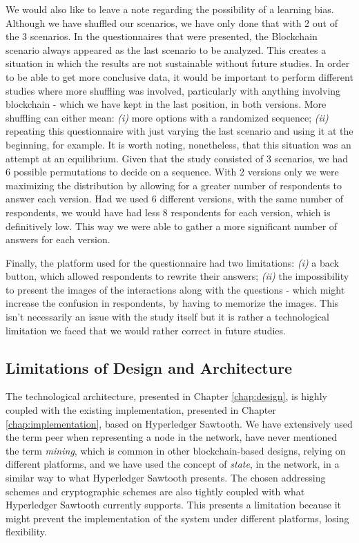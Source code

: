 We would also like to leave a note regarding the possibility of a learning bias. Although we have shuffled our scenarios, we have only done that with 2 out of the 3 scenarios. In the questionnaires that were presented, the Blockchain scenario always appeared as the last scenario to be analyzed. This creates a situation in which the results are not sustainable without future studies. In order to be able to get more conclusive data, it would be important to perform different studies where more shuffling was involved, particularly with anything involving blockchain - which we have kept in the last position, in both versions. More shuffling can either mean: \textit{(i)} more options with a randomized sequence; \textit{(ii)} repeating this questionnaire with just varying the last scenario and using it at the beginning, for example. It is worth noting, nonetheless, that this situation was an attempt at an equilibrium. Given that the study consisted of 3 scenarios, we had 6 possible permutations to decide on a sequence. With 2 versions only we were maximizing the distribution by allowing for a greater number of respondents to answer each version. Had we used 6 different versions, with the same number of respondents, we would have had less 8 respondents for each version, which is definitively low. This way we were able to gather a more significant number of answers for each version.

Finally, the platform used for the questionnaire had two limitations: \textit{(i)} a back button, which allowed respondents to rewrite their answers; \textit{(ii)} the impossibility to present the images of the interactions along with the questions - which might increase the confusion in respondents, by having to memorize the images. This isn't necessarily an issue with the study itself but it is rather a technological limitation we faced that we would rather correct in future studies.

\subsection{Limitations of Design and Architecture}

The technological architecture, presented in Chapter \ref{chap:design}, is highly coupled with the existing implementation, presented in Chapter \ref{chap:implementation}, based on Hyperledger Sawtooth. We have extensively used the term peer when representing a node in the network, have never mentioned the term \emph{mining}, which is common in other blockchain-based designs, relying on different platforms, and we have used the concept of \emph{state}, in the network, in a similar way to what Hyperledger Sawtooth presents. The chosen addressing schemes and cryptographic schemes are also tightly coupled with what Hyperledger Sawtooth currently supports. This presents a limitation because it might prevent the implementation of the system under different platforms, losing flexibility.

